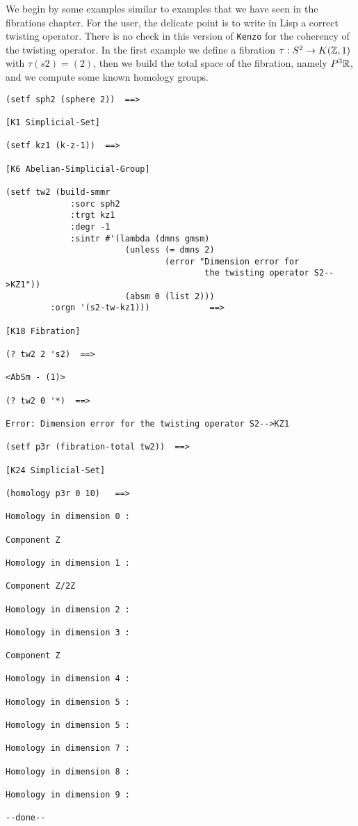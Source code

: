 We begin by some examples similar to examples that we have seen in the fibrations chapter.
For the user, the delicate point is to write in Lisp a correct twisting operator. There is no check
in this version of {\tt Kenzo} for the coherency of the twisting operator. In the first example
we define a fibration $\tau: S^2 \rightarrow K({{\Bbb Z}},1)$ with $\tau(s2)= (2)$, then we build the
total space of the fibration, namely $P^3{{\Bbb R}}$, and we compute some known homology groups.
{\footnotesize\begin{verbatim}
(setf sph2 (sphere 2))  ==>

[K1 Simplicial-Set]

(setf kz1 (k-z-1))  ==>

[K6 Abelian-Simplicial-Group]

(setf tw2 (build-smmr
             :sorc sph2
             :trgt kz1
             :degr -1
             :sintr #'(lambda (dmns gmsm)
                        (unless (= dmns 2)
                                (error "Dimension error for 
                                        the twisting operator S2-->KZ1"))
                        (absm 0 (list 2)))
	     :orgn '(s2-tw-kz1)))            ==>

[K18 Fibration]

(? tw2 2 's2)  ==>

<AbSm - (1)>

(? tw2 0 '*)  ==>

Error: Dimension error for the twisting operator S2-->KZ1

(setf p3r (fibration-total tw2))  ==>

[K24 Simplicial-Set]

(homology p3r 0 10)   ==>

Homology in dimension 0 :

Component Z

Homology in dimension 1 :

Component Z/2Z

Homology in dimension 2 :

Homology in dimension 3 :

Component Z

Homology in dimension 4 :

Homology in dimension 5 :

Homology in dimension 5 :

Homology in dimension 7 :

Homology in dimension 8 :

Homology in dimension 9 :

--done--
\end{verbatim}}
